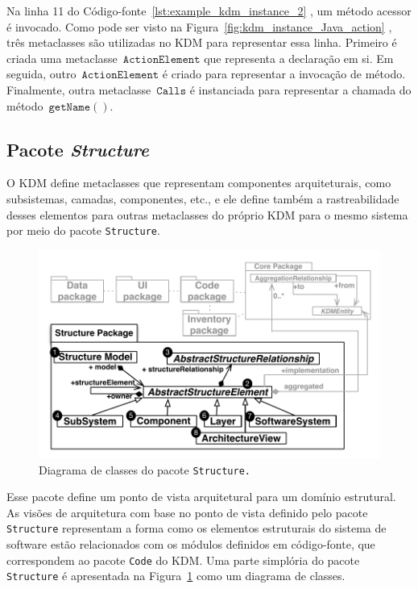 Na linha 11 do Código-fonte~\ref{lst:example_kdm_instance_2} , um método acessor é invocado. Como pode ser visto na Figura~\ref{fig:kdm_instance_Java_action} , três metaclasses são utilizadas no KDM para representar essa linha. Primeiro é criada uma metaclasse~$\mathtt{ActionElement}$ que representa a declaração em si. Em seguida, outro~$\mathtt{ActionElement}$ é criado para representar a invocação de método. Finalmente, outra metaclasse~$\mathtt{Calls}$ é instanciada para representar a chamada do método~$\mathtt{getName()}$.

\subsection{Pacote \textit{Structure}}\label{sec:structurePackage}

O KDM define metaclasses que representam componentes arquiteturais, como subsistemas, camadas, componentes, etc., e ele define também a rastreabilidade desses elementos para outras metaclasses do próprio KDM para o mesmo sistema por meio do pacote \texttt{Structure}.

\begin{figure}[h]
	\centering
	\caption{Diagrama de classes do pacote \texttt{Structure.}\label{fig:structureModel}}
	\includegraphics[scale=0.67]{images/StructurePackageFigure}
\end{figure}

Esse pacote define um ponto de vista arquitetural para um domínio estrutural. As visões de arquitetura com base no ponto de vista definido pelo pacote \texttt{Structure} representam a forma como os elementos estruturais do sistema de software estão relacionados com os módulos definidos em código-fonte, que correspondem ao pacote \texttt{Code} do KDM. Uma parte simplória do pacote \texttt{Structure} é apresentada na Figura~\ref{fig:structureModel} como um diagrama de classes.

